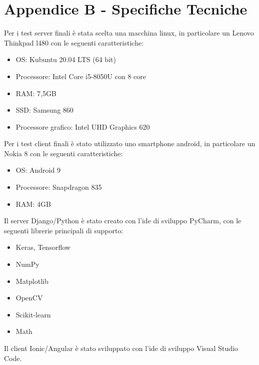 \appendix
\chapter{Appendice B - Specifiche Tecniche}
\label{app:nomeAppendiceA}


Per i test server finali è stata scelta una macchina linux, in particolare un Lenovo Thinkpad l480 con le seguenti caratteristiche:
\begin{itemize}
	\item OS: Kubuntu 20.04 LTS (64 bit)
	\item Processore: Intel Core i5-8050U con 8 core
	\item RAM: 7,5GB
	\item SSD: Samsung 860
	\item Processore grafico: Intel UHD Graphics 620
\end{itemize}

Per i test client finali è stato utilizzato uno smartphone android, in particolare un Nokia 8 con le seguenti caratteristiche:
\begin{itemize}
\item OS: Android 9
\item Processore: Snapdragon 835
\item RAM: 4GB
\end{itemize}

Il server Django/Python è stato creato con l'ide di sviluppo PyCharm, con le seguenti librerie principali di supporto:
\begin{itemize}
\item Keras, Tensorflow
\item NumPy
\item Matplotlib
\item OpenCV
\item Scikit-learn
\item Math
\end{itemize}

Il client Ionic/Angular è stato sviluppato con l'ide di sviluppo Visual Studio Code.

